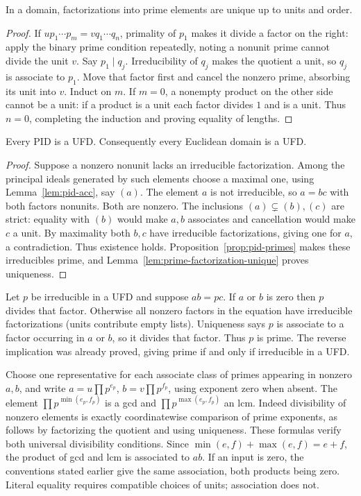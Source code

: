 \begin{lemma}\label{lem:prime-factorization-unique}
In a domain, factorizations into prime elements are unique up to units
and order.
\end{lemma}
\begin{proof}
If $u p_1\cdots p_m=v q_1\cdots q_n$, primality of $p_1$ makes it
divide a factor on the right: apply the binary prime condition repeatedly,
noting a nonunit prime cannot divide the unit $v$.
Say $p_1\mid q_j$. Irreducibility of $q_j$ makes the quotient a unit,
so $q_j$ is associate to $p_1$. Move that factor first and cancel the
nonzero prime, absorbing its unit into $v$. Induct on $m$.
If $m=0$, a nonempty product on the other side cannot be a unit:
if a product is a unit each factor divides $1$ and is a unit.
Thus $n=0$, completing the induction and proving equality of lengths.
\end{proof}

\begin{theorem}\label{thm:pid-implies-ufd}
Every PID is a UFD. Consequently every Euclidean domain is a UFD.
\end{theorem}
\begin{proof}
Suppose a nonzero nonunit lacks an irreducible factorization.
Among the principal ideals generated by such elements choose a maximal
one, using Lemma~\ref{lem:pid-acc}, say $(a)$.
The element $a$ is not irreducible, so $a=bc$ with both factors nonunits.
Both are nonzero. The inclusions $(a)\subsetneq(b),(c)$ are strict:
equality with $(b)$ would make $a,b$ associates and cancellation would
make $c$ a unit. By maximality both $b,c$ have irreducible
factorizations, giving one for $a$, a contradiction.
Thus existence holds. Proposition~\ref{prop:pid-primes} makes these
irreducibles prime, and Lemma~\ref{lem:prime-factorization-unique} proves
uniqueness.
\end{proof}

Let $p$ be irreducible in a UFD and suppose $ab=pc$.
If $a$ or $b$ is zero then $p$ divides that factor. Otherwise all
nonzero factors in the equation have irreducible factorizations
(units contribute empty lists). Uniqueness says $p$ is associate to a
factor occurring in $a$ or $b$, so it divides that factor.
Thus $p$ is prime. The reverse implication was already proved, giving
prime if and only if irreducible in a UFD.

Choose one representative for each associate class of primes appearing
in nonzero $a,b$, and write
$a=u\prod p^{e_p}$, $b=v\prod p^{f_p}$, using exponent zero when absent.
The element $\prod p^{\min(e_p,f_p)}$ is a gcd and
$\prod p^{\max(e_p,f_p)}$ an lcm. Indeed divisibility of nonzero
elements is exactly coordinatewise comparison of prime exponents,
as follows by factorizing the quotient and using uniqueness.
These formulas verify both universal divisibility conditions.
Since $\min(e,f)+\max(e,f)=e+f$, the product of gcd and lcm is
associated to $ab$. If an input is zero, the conventions stated earlier
give the same association, both products being zero. Literal equality
requires compatible choices of units; association does not.

